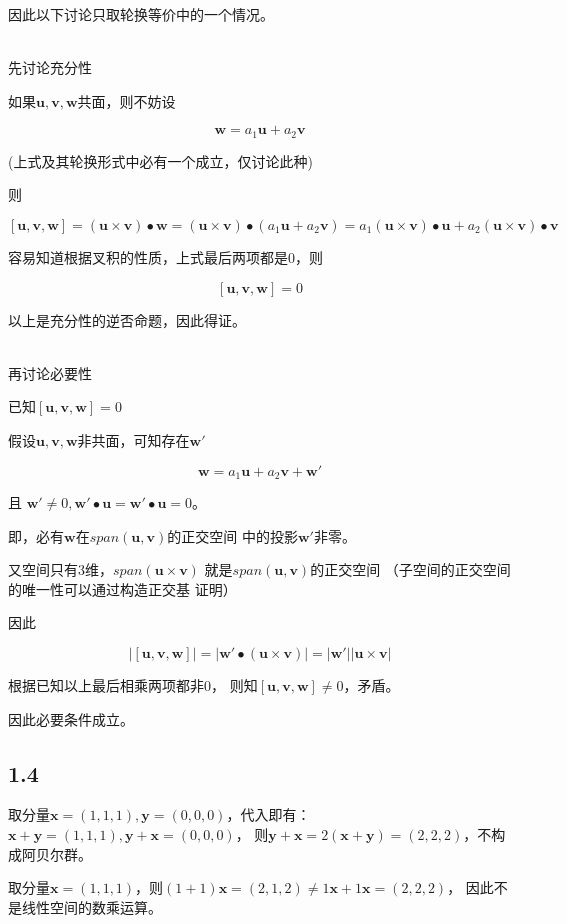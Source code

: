 \documentclass[UTF8,zihao=5]{ctexart}
\newcommand{\bm}[1]{{\mathbf{#1}}}
\begin{document}
因此以下讨论只取轮换等价中的一个情况。

~\\

先讨论充分性

如果$\bm{u},\bm{v},\bm{w}$共面，则不妨设

$$
\bm{w}=a_1\bm{u}+a_2\bm{v}
$$

(上式及其轮换形式中必有一个成立，仅讨论此种)

则

$$
[\bm{u},\bm{v},\bm{w}]=
(\bm{u}\times\bm{v})\bullet\bm{w}
=(\bm{u}\times\bm{v})\bullet(a_1\bm{u}+a_2\bm{v})
=a_1(\bm{u}\times\bm{v})\bullet\bm{u}+
a_2(\bm{u}\times\bm{v})\bullet\bm{v}
$$

容易知道根据叉积的性质，上式最后两项都是0，则

$$
[\bm{u},\bm{v},\bm{w}]=0
$$

以上是充分性的逆否命题，因此得证。

~\\

再讨论必要性

已知$[\bm{u},\bm{v},\bm{w}]=0$

假设$\bm{u},\bm{v},\bm{w}$非共面，可知存在$\bm{w'}$

$$
\bm{w}=a_1\bm{u}+a_2\bm{v}+\bm{w'}
$$

且
$
\bm{w'}\neq 0, 
\bm{w'}\bullet\bm{u}=\bm{w'}\bullet\bm{u}=0
$。

即，必有$\bm{w}$在$span(\bm{u},\bm{v})$的正交空间
中的投影$\bm{w'}$非零。

又空间只有3维，$span(\bm{u}\times\bm{v})$
就是$span(\bm{u},\bm{v})$的正交空间
（子空间的正交空间的唯一性可以通过构造正交基
证明）

因此

$$
\left|[\bm{u},\bm{v},\bm{w}]\right|
=\left|\bm{w'}\bullet(\bm{u}\times\bm{v})\right|
=|\bm{w'}||\bm{u}\times\bm{v}|
$$

根据已知以上最后相乘两项都非0，
则知$[\bm{u},\bm{v},\bm{w}]\neq 0$，矛盾。

因此必要条件成立。

\subsection*{1.4}
取分量$\bm{x}=(1,1,1), \bm{y}=(0,0,0)$，代入即有：
$\bm{x}+\bm{y}=(1,1,1), \bm{y}+\bm{x}=(0,0,0)$，
则$\bm{y}+\bm{x}=2(\bm{x}+\bm{y})=(2,2,2)$，不构成阿贝尔群。

取分量$\bm{x}=(1,1,1)$，则$(1+1)\bm{x}=(2,1,2)\neq 1\bm{x} + 1\bm{x}=(2,2,2)$，
因此不是线性空间的数乘运算。
\end{document}
